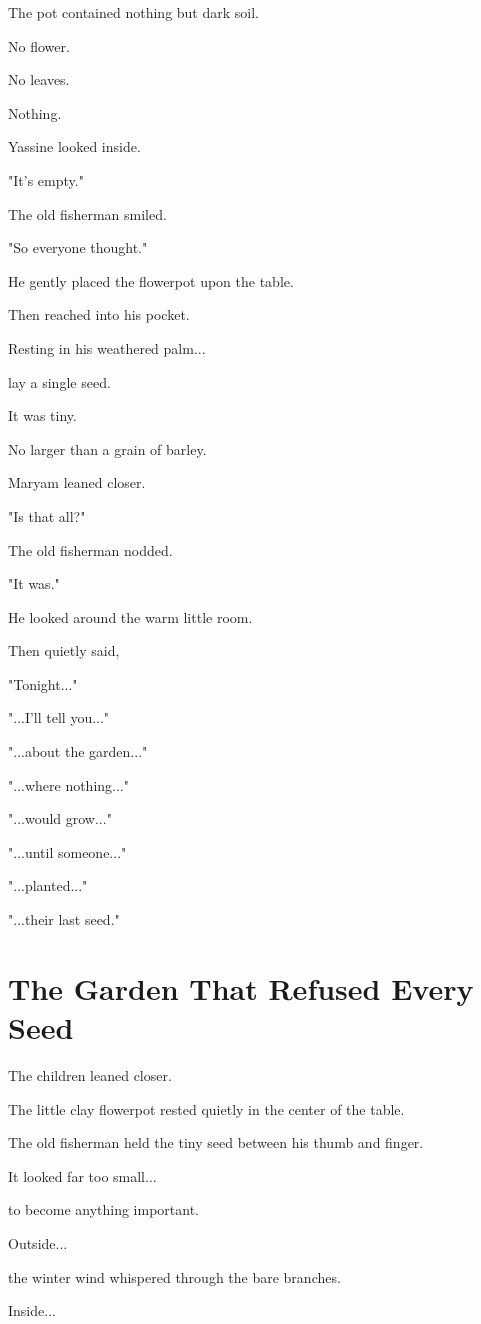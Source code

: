 \documentclass[12pt,openany]{book}
\begin{document}
The pot contained nothing but dark soil.

No flower.

No leaves.

Nothing.

Yassine looked inside.

"It's empty."

The old fisherman smiled.

"So everyone thought."

He gently placed the flowerpot upon the table.

Then reached into his pocket.

Resting in his weathered palm...

lay a single seed.

It was tiny.

No larger than a grain of barley.

Maryam leaned closer.

"Is that all?"

The old fisherman nodded.

"It was."

He looked around the warm little room.

Then quietly said,

"Tonight..."

"...I'll tell you..."

"...about the garden..."

"...where nothing..."

"...would grow..."

"...until someone..."

"...planted..."

"...their last seed."
\section*{The Garden That Refused Every Seed}

The children leaned closer.

The little clay flowerpot rested quietly in the center of the table.

The old fisherman held the tiny seed between his thumb and finger.

It looked far too small...

to become anything important.

Outside...

the winter wind whispered through the bare branches.

Inside...
\end{document}
